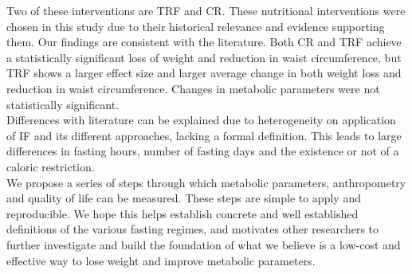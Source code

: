 \documentclass[journal,article,submit,pdftex,moreauthors]{Definitions/mdpi}
\begin{document}
{\color{blue}Two of these interventions are TRF and CR. These nutritional interventions were chosen in this study due to their historical relevance and evidence supporting them. Our findings are consistent with the literature. Both CR and TRF achieve a statistically significant loss of weight and reduction in waist circumference, but TRF shows a larger effect size and larger average change in both weight loss and reduction in waist circumference. Changes in metabolic parameters were not statistically significant.}\\

Differences with literature can be explained due to heterogeneity on application of IF and its different approaches, lacking a formal definition. This leads to large differences in fasting hours, number of fasting days and the existence or not of a caloric restriction.\\

We propose a series of steps through which metabolic parameters, anthropometry and quality of life can be measured. These steps are simple to apply and reproducible. We hope this helps establish concrete and well established definitions of the various fasting regimes, and motivates other researchers to further investigate and build the foundation of what we believe is a low-cost and effective way to lose weight and improve metabolic parameters.\\


\printbibliography


\vspace{6pt} 





\end{document}
